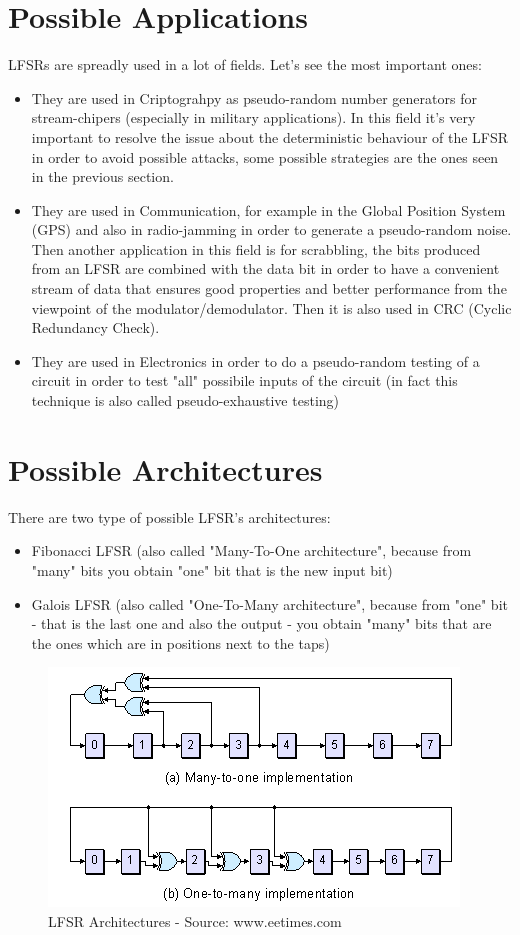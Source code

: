 \documentclass[a4paper]{report}
\begin{document}
\section{Possible Applications}
LFSRs are spreadly used in a lot of fields. Let's see the most important ones:
\begin{itemize}
	\item They are used in Criptograhpy as pseudo-random number generators for stream-chipers (especially in military applications). In this field it's very important to resolve the issue about the deterministic behaviour of the LFSR in order to avoid possible attacks, some possible strategies are the ones seen in the previous section.
	\item They are used in Communication, for example in the Global Position System (GPS) and also in radio-jamming in order to generate a pseudo-random noise. Then another application in this field is for scrabbling, the bits produced from an LFSR are combined with the data bit in order to have a convenient stream of data that ensures good properties and better performance from the viewpoint of the modulator/demodulator. Then it is also used in CRC (Cyclic Redundancy Check).
	\item They are used in Electronics in order to do a pseudo-random testing of a circuit in order to test "all" possibile inputs of the circuit (in fact this technique is also called pseudo-exhaustive testing)
\end{itemize}


\section{Possible Architectures}
There are two type of possible LFSR's architectures:
\begin{itemize}
	\item Fibonacci LFSR (also called "Many-To-One architecture", because from "many" bits you obtain "one" bit that is the new input bit)
	\item Galois LFSR (also called "One-To-Many architecture", because from "one" bit - that is the last one and also the output - you obtain "many" bits that are the ones which are in positions next to the taps)
\end{itemize}
\begin{figure}[htpb]
	\centering
	\includegraphics[scale=0.9]{img/architectures.png}
	\caption{LFSR Architectures - Source: www.eetimes.com}
\end{figure}
\end{document}
